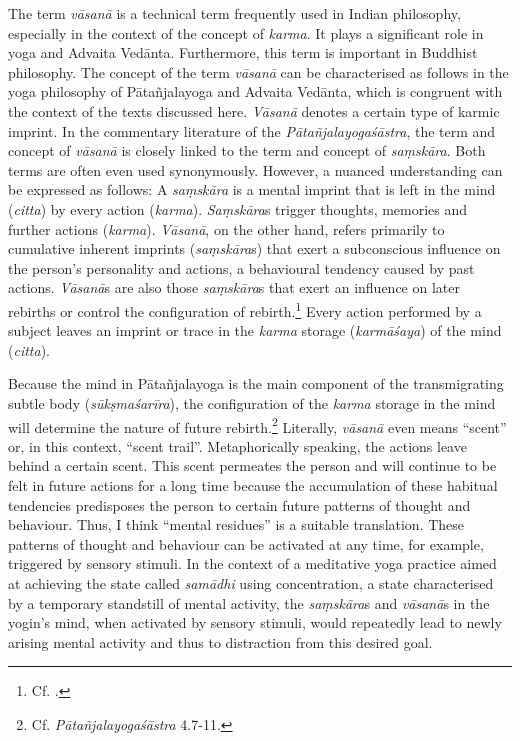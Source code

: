 The term \textit{vāsanā} is a technical term frequently used in Indian philosophy, especially in the context of the concept of \textit{karma}. It plays a significant role in yoga and Advaita Vedānta. Furthermore, this term is important in Buddhist philosophy. The concept of the term \textit{vāsanā} can be characterised as follows in the yoga philosophy of Pātañjalayoga and Advaita Vedānta, which is congruent with the context of the texts discussed here. \textit{Vāsanā} denotes a certain type of karmic imprint. In the commentary literature of the \textit{Pātañjalayogaśāstra}, the term and concept of \textit{vāsanā} is closely linked to the term and concept of \textit{saṃskāra}. Both terms are often even used synonymously. However, a nuanced understanding can be expressed as follows: A \textit{saṃskāra} is a mental imprint that is left in the mind (\textit{citta}) by every action (\textit{karma}). \textit{Saṃskāra}s trigger thoughts, memories and further actions (\textit{karma}). \textit{Vāsanā}, on the other hand, refers primarily to cumulative inherent imprints (\textit{saṃskāra}s) that exert a subconscious influence on the person's personality and actions, a behavioural tendency caused by past actions. \textit{Vāsanā}s are also those \textit{saṃskāra}s that exert an influence on later rebirths or control the configuration of rebirth.\footnote{Cf. \citeauthor[2009: 418]{bryant2009}.} Every action performed by a subject leaves an imprint or trace in the \textit{karma} storage (\textit{karmāśaya}) of the mind (\textit{citta}).

Because the mind in Pātañjalayoga is the main component of the transmigrating subtle body (\textit{sūkṣmaśarīra}), the configuration of the \textit{karma} storage in the mind will determine the nature of future rebirth.\footnote{Cf. \textit{Pātañjalayogaśāstra} 4.7-11.} Literally, \textit{vāsanā} even means ``scent'' or, in this context, ``scent trail''. Metaphorically speaking, the actions leave behind a certain scent. This scent permeates the person and will continue to be felt in future actions for a long time because the accumulation of these habitual tendencies predisposes the person to certain future patterns of thought and behaviour. Thus, I think ``mental residues'' is a suitable translation. These patterns of thought and behaviour can be activated at any time, for example, triggered by sensory stimuli. In the context of a meditative yoga practice aimed at achieving the state called \textit{samādhi} using concentration, a state characterised by a temporary standstill of mental activity, the \textit{saṃskāra}s and \textit{vāsanā}s in the yogin's mind, when activated by sensory stimuli, would repeatedly lead to newly arising mental activity and thus to distraction from this desired goal.

